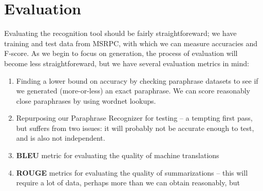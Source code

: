 \documentclass[11pt, reqno]{amsart}
\begin{document}
	\section{Evaluation}
	Evaluating the recognition tool should be fairly straightforeward; we have training and test data from MSRPC, with which we can measure accuracies and F-score. As we begin to focus on generation, the process of evaluation will become less straightforeward, but we have several evaluation metrics in mind:
	\begin{enumerate}
		\item Finding a lower bound on accuracy by checking paraphrase datasets to see if we generated (more-or-less) an exact paraphrase. We can score reasonably close paraphrases by using wordnet lookups.
		\item Repurposing our Paraphrase Recognizer for testing -- a tempting first pass, but suffers from two issues: it will probably not be accurate enough to test, and is also not independent. 
		\item \textbf{BLEU} metric for evaluating the quality of machine translations
		\item \textbf{ROUGE} metrics for evaluating the quality of summarizations -- this will require a lot of data, perhaps more than we can obtain reasonably, but 
	\end{enumerate}
	
\end{document}
